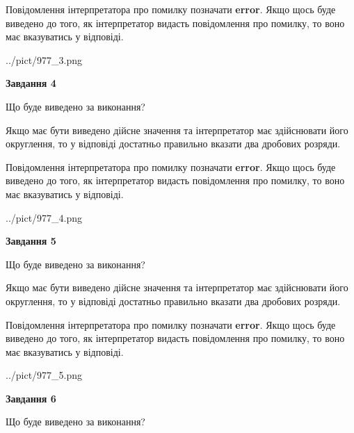 \documentclass[12pt, ukrainian]{article}
\begin{document}
{\begin {Large}
Повідомлення інтерпретатора про помилку позначати \textbf{error}.
Якщо щось буде виведено до того, як інтерпретатор видасть повідомлення про помилку, 
то воно має вказуватись у відповіді. \par

\begin{center}
	{../pict/977_3.png}
\end{center}
\newpage

{\begin {center}\textbf{Завдання 4}\end {center}}\par
Що буде виведено за виконання? \par

Якщо має бути виведено дійсне значення та інтерпретатор має здійснювати його округлення, 
то у відповіді достатньо правильно вказати два дробових розряди.

Повідомлення інтерпретатора про помилку позначати \textbf{error}.
Якщо щось буде виведено до того, як інтерпретатор видасть повідомлення про помилку, 
то воно має вказуватись у відповіді. \par

\begin{center}
	{../pict/977_4.png}
\end{center}
\newpage

{\begin {center}\textbf{Завдання 5}\end {center}}\par
Що буде виведено за виконання? \par

Якщо має бути виведено дійсне значення та інтерпретатор має здійснювати його округлення, 
то у відповіді достатньо правильно вказати два дробових розряди.

Повідомлення інтерпретатора про помилку позначати \textbf{error}.
Якщо щось буде виведено до того, як інтерпретатор видасть повідомлення про помилку, 
то воно має вказуватись у відповіді. \par

\begin{center}
	{../pict/977_5.png}
\end{center}
\newpage

{\begin {center}\textbf{Завдання 6}\end {center}}\par
Що буде виведено за виконання? \par


\end{Large}}
\end{document}
